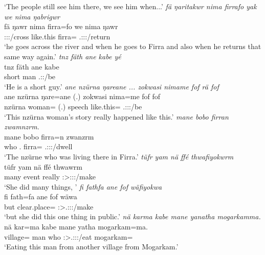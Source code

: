 \begin{exe}
	\trans `The people still see him there, we see him when...'
	\emph{fä ŋaritakwr nima firrafo yak we nima ŋabrigwr}\\
	\gll fä ŋawr nima firra=fo  we nima ŋawr\\
	{\Dist} \Stsg:\Sbj:\Nonpast:\Ipfv/cross {like.this} firra={\All} \Tsg.\Masc:\Sbj:\Nonpast:\Ipfv/return\\
	\trans `he goes across the river and when he goes to Firra and also when he returns that same way again.'
	\emph{tnz fäth ane kabe yé}\\
	\gll tnz fäth ane kabe \\
	short \Dim{} {\Dem} man \Tsg.\Masc:\Nonpast:\Ipfv/be\\
	\trans `He is a short guy.'
	\emph{ane nzürna ŋareane ... zokwasi nimame fof rä fof}\\
	\gll ane nzürna ŋare=ane (.) zokwasi nima=me fof  fof\\
	{\Dem} nzürna woman={\Poss} (.) speech like.this={\Ins} {\Emph} \Tsg.\F:\Sbj:\Nonpast:\Ipfv/be {\Emph}\\
	\trans `This nzürna woman's story really happened like this.'
	\emph{mane bobo firran zwamnzrm.}\\
	\gll mane bobo firra=n zwanzrm\\
	who \Med.{\All} firra={\Loc} \Tsg.\F:\Sbj:\Pst:\Dur/dwell\\
	\trans `The nzürne who was living there in Firra.'
\newpage 	
{}
	\emph{tüfr yam nä ffé thwafiyokwrm}\\
	\gll tüfr yam nä ffé thwawrm\\
	many event {\Indf} really \Sg:\Sbj>\Stpl:\Obj:\Pst:\Dur/make\\
	\trans `She did many things, '
	\emph{fi fathfa ane fof wäfiyokwa}\\
	\gll fi fath=fa ane fof wäwa\\
	but clear.place={\Abl} {\Dem} {\Emph} \Sg:\Sbj>\Tsg.\F:\Obj:\Pst:\Ipfv/make\\
	\trans `but she did this one thing in public.'
	\emph{nä karma kabe mane yanatha mogarkamma.}\\
	\gll nä kar=ma kabe mane yatha mogarkam=ma.\\
	{\Indf} village={\Char} man who \Sg:\Sbj>\Tsg.\Masc:\Obj:\Pst:\Ipfv/eat mogarkam=\Char\\
	\trans `Eating this man from another village from Mogarkam.'

\end{exe}
